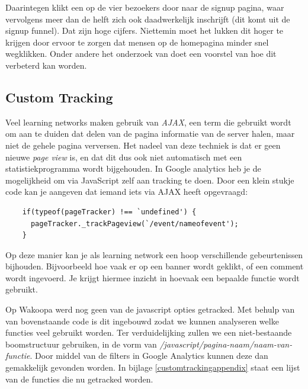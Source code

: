\documentclass[a4paper, 10pt, pdftex]{report}
\begin{document}
    Daarintegen klikt een op de vier bezoekers door naar de signup pagina, waar vervolgens meer dan de helft zich ook daadwerkelijk inschrijft (dit komt uit de signup funnel). Dat zijn hoge cijfers. Niettemin moet het lukken dit hoger te krijgen door ervoor te zorgen dat mensen op de homepagina minder snel wegklikken. Onder andere het onderzoek van \cite{Hoekman2008} doet een voorstel van hoe dit verbeterd kan worden.

    \subsection{Custom Tracking}
    Veel learning networks maken gebruik van \emph{AJAX}, een term die gebruikt wordt om aan te duiden dat delen van de pagina informatie van de server halen, maar niet de gehele pagina verversen. Het nadeel van deze techniek is dat er geen nieuwe \emph{page view} is, en dat dit dus ook niet automatisch met een statistiekprogramma wordt bijgehouden. In Google analytics heb je de mogelijkheid om via JavaScript zelf aan tracking te doen. Door een klein stukje code kan je aangeven dat iemand iets via AJAX heeft opgevraagd:
    \begin{verbatim}
    if(typeof(pageTracker) !== `undefined') {
      pageTracker._trackPageview(`/event/nameofevent');
    }
    \end{verbatim}
    Op deze manier kan je als learning network een hoop verschillende gebeurtenissen bijhouden. Bijvoorbeeld hoe vaak er op een banner wordt geklikt, of een comment wordt ingevoerd. Je krijgt hiermee inzicht in hoevaak een bepaalde functie wordt gebruikt.

    Op Wakoopa werd nog geen van de javascript opties getracked. Met behulp van van bovenstaande code is dit ingebouwd zodat we kunnen analyseren welke functies veel gebruikt worden. Ter verduidelijking zullen we een niet-bestaande boomstructuur gebruiken, in de vorm van \emph{/javascript/pagina-naam/naam-van-functie}. Door middel van de filters in Google Analytics kunnen deze dan gemakkelijk gevonden worden. In bijlage \ref{customtrackingappendix} staat een lijst van de functies die nu getracked worden.
\end{document}
